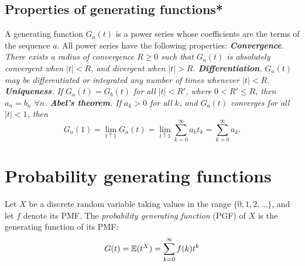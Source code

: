 \subsection{Properties of generating functions*} 

A generating function $G_a(t)$ is a power series whose coefficients are the terms of the sequence $a$. All power series have the following properties:
\bit
\it
\textbf{Convergence}. There exists a \emph{radius of convergence} $R\geq 0$ such that $G_a(t)$ is absolutely convergent when $|t|<R$, and divergent when $|t|>R$.
\it
\textbf{Differentiation}. $G_a(t)$ may be differentiated or integrated any number of times whenever $|t|<R$.
\it
\textbf{Uniqueness}. If $G_a(t)=G_b(t)$ for all $|t|<R'$, where $0<R'\leq R$, then $a_n=b_n$ $\forall n$.
\it
\textbf{Abel's theorem}. If $a_k>0$ for all $k$, and $G_a(t)$ converges for all $|t|<1$, then 
\[
G_a(1) = \lim_{t\uparrow 1}G_a(t) = \lim_{t\uparrow 1}\sum_{k=0}^{\infty} a_k t_k = \sum_{k=0}^{\infty} a_k.
\]
\eit





\section{Probability generating functions}

\begin{definition}
Let $X$ be a discrete random variable taking values in the range $\{0,1,2,\ldots\}$, and let $f$ denote its PMF. The \emph{probability generating function} (PGF) of $X$ is the generating function of its PMF:
\[
G(t) = \mathbb{E}(t^X) = \sum_{k=0}^{\infty} f(k) t^k 
\]
\end{definition}

